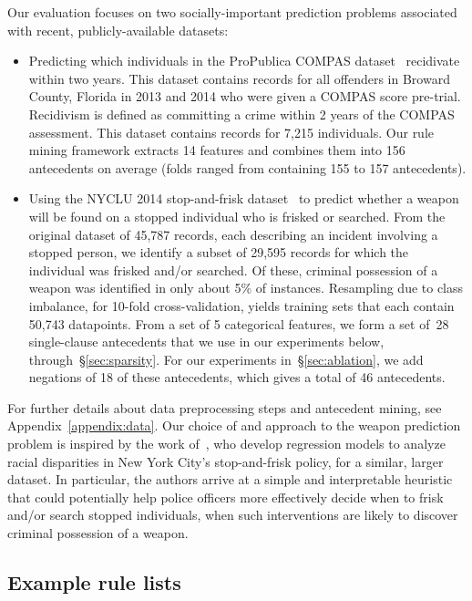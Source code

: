 Our evaluation focuses on two socially-important prediction problems associated
with recent, publicly-available datasets:
\begin{itemize}
\item Predicting which individuals in the ProPublica COMPAS
dataset~\citep{LarsonMaKiAn16} recidivate within two years.
This dataset contains records for all offenders in Broward County, Florida
in 2013 and 2014 who were given a COMPAS score pre-trial.
Recidivism is defined as committing a crime within 2 years of the COMPAS
assessment.
This dataset contains records for 7,215 individuals.
%
Our rule mining framework extracts 14 features and combines them into
156 antecedents on average (folds ranged from containing 155 to 157 antecedents).
%
\item Using the NYCLU 2014 stop-and-frisk dataset~\citep{nyclu:2014} to predict
whether a weapon will be found on a stopped individual who is frisked or searched.
%
From the original dataset of 45,787 records, each describing an incident involving
a stopped person, we identify a subset of 29,595 records for which the individual
was frisked and/or searched.
%
Of these, criminal possession of a weapon was identified in only about 5\% of instances.
%
Resampling due to class imbalance, for 10-fold cross-validation, yields training sets
that each contain 50,743 datapoints.
%
From a set of 5 categorical features, we form a set of~28 single-clause antecedents
that we use in our experiments below, through~\S\ref{sec:sparsity}.
%
For our experiments in~\S\ref{sec:ablation}, we add negations of 18 of these antecedents,
which gives a total of 46 antecedents.
\end{itemize}
%
For further details about data preprocessing steps and antecedent mining,
see Appendix~\ref{appendix:data}.
%
Our choice of and approach to the weapon prediction problem is inspired by the work
of~\citet{Goel16}, who develop regression models to analyze racial disparities
in New York City's stop-and-frisk policy, for a similar, larger dataset.
%
In particular, the authors arrive at a simple and interpretable heuristic that
could potentially help police officers more effectively decide when to
frisk and/or search stopped individuals, \ie when such
interventions are likely to discover criminal possession of a weapon.

\subsection{Example rule lists}
\label{sec:examples}

